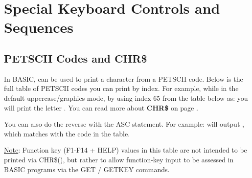 \chapter{Special Keyboard Controls and Sequences}


\section{PETSCII Codes and CHR\$}

\label{appendix:asciicodes}

In BASIC,   can be used to print a character from a PETSCII code.
Below is the full table of PETSCII codes you can print by index.  For example, while in the default uppercase/graphics mode, by
using index 65 from the table below as:  you will
print the letter . You can read more about {\bf CHR\$} on page \pageref{chrcommand}.

You can also do the reverse with the ASC statement.  For example:
 will output , which matches with the
code in the table.

\underline{Note}: Function key (F1-F14 + HELP) values in this table are not intended to be printed via CHR\$(),
but rather to allow function-key input to be assessed in BASIC programs via the GET / GETKEY commands.

